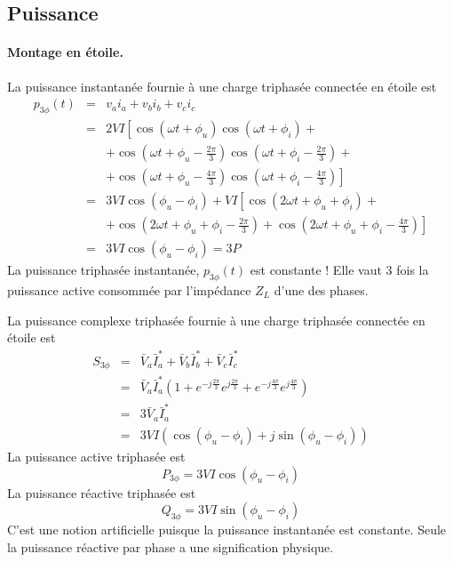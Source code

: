 \subsection{Puissance}
\paragraph{Montage en étoile.}
La puissance instantanée fournie à une charge triphasée connectée en
étoile est 
\begin{eqnarray*}
	p_{3\phi}(t)& =& v_ai_a+v_bi_b+v_ci_c\\
	& = & 2VI\left[\cos(\omega t+\phi_u)\cos(\omega t+\phi_i)+ \right.\\
	& & \left. + \cos(\omega
	t+\phi_u-\frac{2\pi}{3})\cos(\omega t+\phi_i-\frac{2\pi}{3})+ \right.\\
	& & \left. +\cos(\omega t+\phi_u-\frac{4\pi}{3})\cos(\omega
	t+\phi_i-\frac{4\pi}{3})\right]\\
	& = &3VI\cos(\phi_u-\phi_i)+ VI\left[
	\cos(2\omega t+\phi_u+\phi_i)+ \right.\\
	& & \left. + \cos(2\omega t+\phi_u+\phi_i-\frac{2\pi}{3})+
	\cos(2\omega t+\phi_u+\phi_i-\frac{4\pi}{3})\right]\\
	& = & 3VI\cos(\phi_u-\phi_i)=3P
\end{eqnarray*}
La puissance triphasée instantanée, $p_{3\phi}(t)$ est constante !
Elle vaut 3 fois la puissance active consommée par l'impédance $Z_L$  d'une des phases.

La puissance complexe triphasée fournie à une charge triphasée connectée en
étoile est 
\begin{eqnarray*}
	S_{3\phi}& = &\bar{V}_a\bar{I}_a^*+\bar{V}_b\bar{I}_b^*+\bar{V}_c\bar{I}_c^*\\
	& = & \bar{V}_a\bar{I}_a^*(1+e^{-j\frac{2\pi}{3}}e^{j\frac{2\pi}{3}}+
	e^{-j\frac{4\pi}{3}}e^{j\frac{4\pi}{3}})\\
	& =& 3\bar{V}_a\bar{I}_a^*\\
	& = & 3VI(\cos(\phi_u-\phi_i)+j\sin(\phi_u-\phi_i))
\end{eqnarray*}
La puissance active triphasée est 
	\[P_{3\phi}=3VI\cos(\phi_u-\phi_i)\]
La puissance réactive triphasée est 
	\[Q_{3\phi}=3VI\sin(\phi_u-\phi_i)\]
C'est une notion artificielle puisque la puissance instantanée est constante. Seule la puissance réactive par phase a une signification physique.

